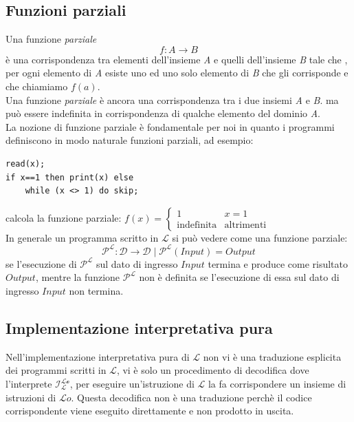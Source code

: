 \documentclass[12pt]{report}
\begin{document}
	\subsection{Funzioni parziali}
	Una funzione \textit{parziale}
	\[
	f: A \to B
	\]
	è una corrispondenza tra elementi dell'insieme \textit{A} e quelli dell'insieme \textit{B} tale che , per ogni elemento di \textit{A} esiste uno ed uno solo elemento di \textit{B} che gli corrisponde e che chiamiamo $f(a)$. \\
	Una funzione \textit{parziale} è ancora una corrispondenza tra i due insiemi \textit{A} e \textit{B}. ma può essere indefinita in corrispondenza di qualche elemento del dominio \textit{A}. \\
	La nozione di funzione parziale è fondamentale per noi in quanto i programmi definiscono in modo naturale funzioni parziali, ad esempio:
	\begin{lstlisting}[style=pascalstyle]
read(x);
if x==1 then print(x) else
	while (x <> 1) do skip;
	\end{lstlisting}
	calcola la funzione parziale:
	$f(x) = \begin{cases}
		1 & x=1 \\
		\text{indefinita} & \text{altrimenti}
	\end{cases}$ \\
	In generale un programma scritto in $\mathcal{L}$ si può vedere come una funzione parziale:
	\[
	\mathcal{P^L}: \mathcal{D} \to \mathcal{D} \mid \mathcal{P^L}(Input) = Output
	\]
	se l'esecuzione di $\mathcal{P^L}$ sul dato di ingresso $Input$ termina e produce come risultato $Output$, mentre la funzione $\mathcal{P^L}$ non è definita se l'esecuzione di essa sul dato di ingresso $Input$ non termina.
	\subsection{Implementazione interpretativa pura}
	{
	}
	Nell'implementazione interpretativa pura di $\mathcal{L}$ non vi è una traduzione esplicita dei programmi scritti in $\mathcal{L}$, vi è solo un procedimento di decodifica dove l'interprete $\mathcal{I^{L\text{o}}_{L}}$, per eseguire un'istruzione di $\mathcal{L}$ la fa corrispondere un insieme di istruzioni di $\mathcal{L}o$. Questa decodifica non è una traduzione perchè il codice corrispondente viene eseguito direttamente e non prodotto in uscita.
\end{document}
